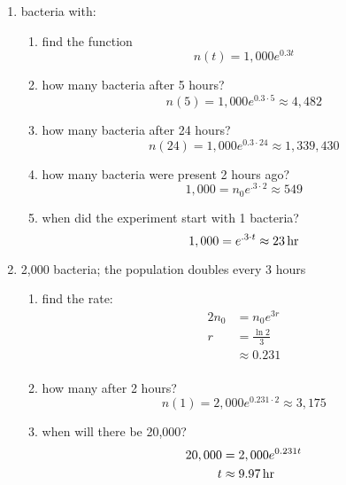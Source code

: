 \documentclass{exam}
\begin{document}
  \begin{enumerate}
    \item bacteria with:

      \begin{enumerate}[a]
        \item find the function 
          \[
            n(t) = 1,000 e^{0.3 t}
          \]

        \item how many bacteria after 5 hours? 
          \[
            n(5) = 1,000 e^{0.3 \cdot 5} \approx 4,482
          \]

        \item how many bacteria after 24 hours? 
          \[
            n(24) = 1,000 e^{0.3 \cdot 24} \approx 1,339,430
          \]

        \item how many bacteria were present 2 hours ago? 
          \[
            1,000 = n_0 e^{.3 \cdot 2} \approx 549 
          \]

        \item when did the experiment start with 1 bacteria?
          \[
            1,000 = e^{.3 \cdot t} \approx \unit[23]{hr} 
          \]

      \end{enumerate}

    \item 2,000 bacteria; the population doubles every 3 hours
      
      \begin{enumerate}[a]
        \item find the rate:
          \begin{align*}
            2n_0 & = n_0 e^{3r} \\
            r    & = \frac{\ln 2}{3} \\
                 & \approx 0.231 \\
          \end{align*}

        \item how many after 2 hours?
          \[
            n(1) = 2,000 e^{0.231 \cdot 2} \approx 3,175
          \]

        \item when will there be 20,000?
          \begin{align*}
            20,000 & = 2,000 e^{0.231 t} \\
            t      & \approx \unit[9.97]{hr} \\
          \end{align*}

      \end{enumerate}
      
  \end{enumerate}
\end{document}
